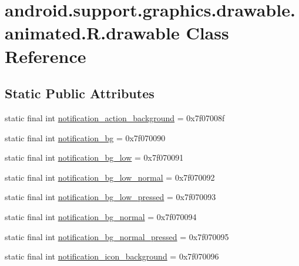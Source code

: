 \hypertarget{classandroid_1_1support_1_1graphics_1_1drawable_1_1animated_1_1R_1_1drawable}{}\section{android.\+support.\+graphics.\+drawable.\+animated.\+R.\+drawable Class Reference}
\label{classandroid_1_1support_1_1graphics_1_1drawable_1_1animated_1_1R_1_1drawable}
\subsection*{Static Public Attributes}
\begin{DoxyCompactItemize}
\item 
static final int \mbox{\hyperlink{classandroid_1_1support_1_1graphics_1_1drawable_1_1animated_1_1R_1_1drawable_a11bf3dd87b85eec07b682350dce74f85}{notification\+\_\+action\+\_\+background}} = 0x7f07008f
\item 
static final int \mbox{\hyperlink{classandroid_1_1support_1_1graphics_1_1drawable_1_1animated_1_1R_1_1drawable_a867e41930939ea97edaed48e8c3f9677}{notification\+\_\+bg}} = 0x7f070090
\item 
static final int \mbox{\hyperlink{classandroid_1_1support_1_1graphics_1_1drawable_1_1animated_1_1R_1_1drawable_ae36224aa069ed404237d9d5ec69a6d24}{notification\+\_\+bg\+\_\+low}} = 0x7f070091
\item 
static final int \mbox{\hyperlink{classandroid_1_1support_1_1graphics_1_1drawable_1_1animated_1_1R_1_1drawable_a9da9694ce9c699c8014efb3291936fa8}{notification\+\_\+bg\+\_\+low\+\_\+normal}} = 0x7f070092
\item 
static final int \mbox{\hyperlink{classandroid_1_1support_1_1graphics_1_1drawable_1_1animated_1_1R_1_1drawable_ae6eb1de4089432615613842d9321c3ac}{notification\+\_\+bg\+\_\+low\+\_\+pressed}} = 0x7f070093
\item 
static final int \mbox{\hyperlink{classandroid_1_1support_1_1graphics_1_1drawable_1_1animated_1_1R_1_1drawable_a386dcd24ded6a7299fee657aceb353ba}{notification\+\_\+bg\+\_\+normal}} = 0x7f070094
\item 
static final int \mbox{\hyperlink{classandroid_1_1support_1_1graphics_1_1drawable_1_1animated_1_1R_1_1drawable_a863b5c208c30d1d07332657c216a2af2}{notification\+\_\+bg\+\_\+normal\+\_\+pressed}} = 0x7f070095
\item 
static final int \mbox{\hyperlink{classandroid_1_1support_1_1graphics_1_1drawable_1_1animated_1_1R_1_1drawable_a22985c9b80fbf6074397962a880837b7}{notification\+\_\+icon\+\_\+background}} = 0x7f070096

\end{DoxyCompactItemize}
